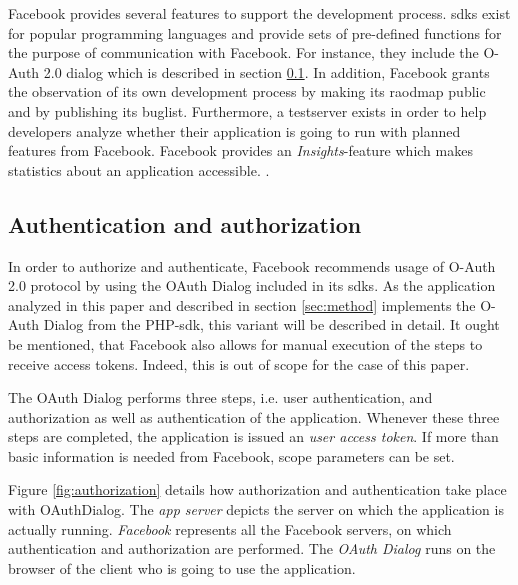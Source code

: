 \documentclass[preprint,12pt]{elsarticle}
\begin{document}
Facebook provides several features to support the development
process. \ac{sdks} exist for popular programming languages and provide
sets of pre-defined functions for the purpose of communication with Facebook. For
instance, they include the O-Auth 2.0 dialog which is described in
section \ref{sec:auth-auth}. In
addition, Facebook grants the observation of its own development process by
making its raodmap public and by publishing its buglist. Furthermore, a
testserver exists in order to help developers analyze whether their application
is going to run with planned features from Facebook. 
Facebook provides an \textit{Insights}-feature which makes
statistics about an application accessible. \cite{oreilly}.



\subsection{Authentication and authorization}
\label{sec:auth-auth}
In order to authorize and authenticate, Facebook recommends usage of
O-Auth 2.0 protocol by using the OAuth Dialog included in its
\ac{sdks}. As the application analyzed in this paper and described in section 
\ref{sec:method} implements the O-Auth Dialog from the PHP-\ac{sdk},
this variant will be described in detail. It ought be mentioned,
that Facebook also allows for manual execution of the steps to receive
access tokens.\cite{facebookDevAuth}  Indeed, this is
out of scope for the case of this paper.

The OAuth Dialog performs three steps, i.e. user authentication, 
and authorization as well as authentication of the
application. Whenever these three steps are completed, the application is
issued an \textit{user access token}. If more than basic information
is needed from Facebook, scope parameters can be set.\cite{facebookDevAuth}

Figure \ref{fig:authorization} details how authorization and
authentication take place with OAuthDialog. The \textit{app server}
depicts the server on which the application is actually
running. \textit{Facebook} represents all the Facebook servers, on
which authentication and authorization are performed. The \textit{OAuth
  Dialog} runs on the browser of the client who is going to use the
application.
\end{document}
